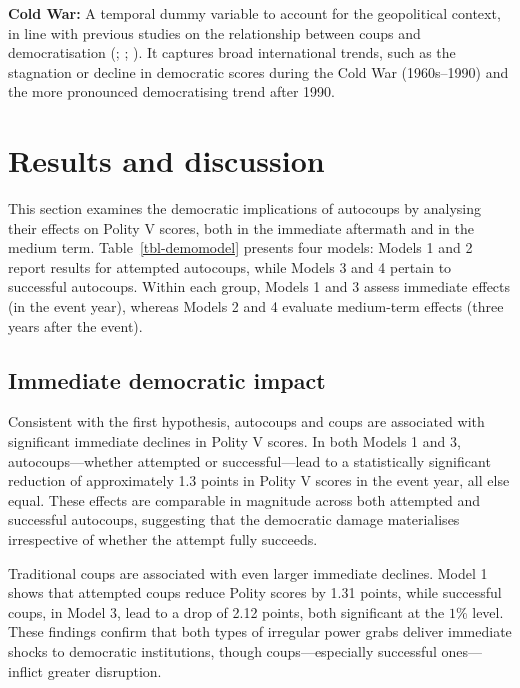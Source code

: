 \documentclass[
  12pt,
]{report}
\begin{document}
\textbf{Cold War:} A temporal dummy variable to account for the
geopolitical context, in line with previous studies on the relationship
between coups and democratisation (; ; ). It captures
broad international trends, such as the stagnation or decline in
democratic scores during the Cold War (1960s--1990) and the more
pronounced democratising trend after 1990.

\section{Results and discussion}\label{results-and-discussion-1}

This section examines the democratic implications of autocoups by
analysing their effects on Polity V scores, both in the immediate
aftermath and in the medium term. Table~\ref{tbl-demomodel} presents
four models: Models 1 and 2 report results for attempted autocoups,
while Models 3 and 4 pertain to successful autocoups. Within each group,
Models 1 and 3 assess immediate effects (in the event year), whereas
Models 2 and 4 evaluate medium-term effects (three years after the
event).

\subsection*{Immediate democratic
impact}\label{immediate-democratic-impact}

Consistent with the first hypothesis, autocoups and coups are associated
with significant immediate declines in Polity V scores. In both Models 1
and 3, autocoups---whether attempted or successful---lead to a
statistically significant reduction of approximately 1.3 points in
Polity V scores in the event year, all else equal. These effects are
comparable in magnitude across both attempted and successful autocoups,
suggesting that the democratic damage materialises irrespective of
whether the attempt fully succeeds.

Traditional coups are associated with even larger immediate declines.
Model 1 shows that attempted coups reduce Polity scores by 1.31 points,
while successful coups, in Model 3, lead to a drop of 2.12 points, both
significant at the \(1\%\) level. These findings confirm that both types
of irregular power grabs deliver immediate shocks to democratic
institutions, though coups---especially successful ones---inflict
greater disruption.
\end{document}
